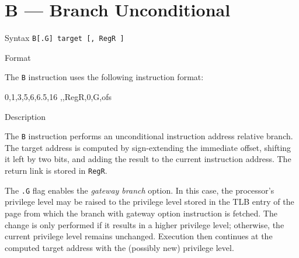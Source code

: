 %
%
\pagebreak
\section*{B — Branch Unconditional}

\begin{iPageDescEntry}{Syntax} 
  \texttt{B[.G] target [, RegR ]} \\
\end{iPageDescEntry}

\begin{iPageDescEntry}{Format}

The \texttt{B} instruction uses the following instruction format: \\

\begin{flushleft}
  \drawInstrFormat
  	{0,1,3,5,6,6.5,16}
  	{\OpCodeGrpBR,\OpCodeB,RegR,0,G,ofs}
\end{flushleft}

\end{iPageDescEntry}

\begin{iPageDescEntry}{Description}

The \texttt{B} instruction performs an unconditional instruction address relative branch.  
The target address is computed by sign-extending the immediate offset, shifting it left by two bits, and adding the result to the current instruction address. The return link is stored in \texttt{RegR}. 

The \texttt{.G} flag enables the \emph{gateway branch} option. In this case, the processor’s privilege level may be raised to the privilege level stored in the TLB entry of the page from which the branch with gateway option instruction is fetched. The change is only performed if it results in a higher privilege level; otherwise, the current privilege level remains unchanged. Execution then continues at the computed target address with the (possibly new) privilege level.  

\end{iPageDescEntry}

